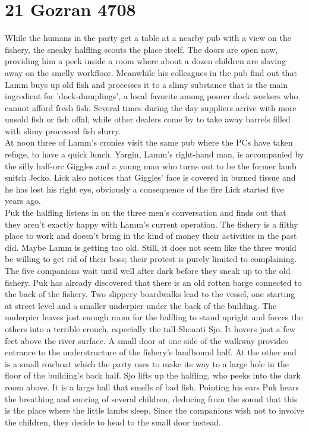 \section{21 Gozran 4708}

While the humans in the party get a table at a nearby pub with a view on the fishery, the sneaky halfling scouts the place itself. The doors are open now, providing him a peek inside a room where about a dozen children are slaving away on the smelly workfloor. Meanwhile his colleagues in the pub find out that Lamm buys up old fish and processes it to a slimy substance that is the main ingredient for 'dock-dumplings', a local favorite among poorer dock workers who cannot afford fresh fish. Several times during the day suppliers arrive with more unsold fish or fish offal, while other dealers come by to take away barrels filled with slimy processed fish slurry.\\

At noon three of Lamm's cronies visit the same pub where the PCs have taken refuge, to have a quick lunch. Yargin, Lamm's right-hand man, is accompanied by the silly half-orc Giggles and a young man who turns out to be the former lamb snitch Jecko. Lick also notices that Giggles' face is covered in burned tissue and he has lost his right eye, obviously a consequence of the fire Lick started five years ago.\\

Puk the halfling listens in on the three men's conversation and finds out that they aren't exactly happy with Lamm's current operation. The fishery is a filthy place to work and doesn't bring in the kind of money their activities in the past did. Maybe Lamm is getting too old. Still, it does not seem like the three would be willing to get rid of their boss; their protest is purely limited to complaining.\\

The five companions wait until well after dark before they sneak up to the old fishery. Puk has already discovered that there is an old rotten barge connected to the back of the fishery. Two slippery boardwalks lead to the vessel, one starting at street level and a smaller underpier under the back of the building. The underpier leaves just enough room for the halfling to stand upright and forces the others into a terrible crouch, especially the tall Shoanti Sjo. It hovers just a few feet above the river surface. A small door at one side of the walkway provides entrance to the understructure of the fishery's landbound half. At the other end is a small rowboat which the party uses to make its way to a large hole in the floor of the building's back half. Sjo lifts up the halfling, who peeks into the dark room above. It is a large hall that smells of bad fish. Pointing his ears Puk hears the breathing and snoring of several children, deducing from the sound that this is the place where the little lambs sleep. Since the companions wish not to involve the children, they decide to head to the small door instead.\\

